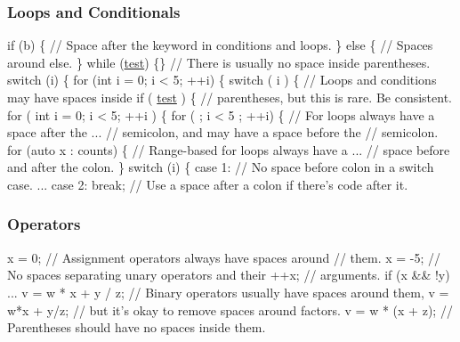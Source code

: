 \subsubsection*{Loops and Conditionals}


\begin{DoxyCode}
\textcolor{keywordflow}{if} (b) \{          \textcolor{comment}{// Space after the keyword in conditions and loops.}
\} \textcolor{keywordflow}{else} \{          \textcolor{comment}{// Spaces around else.}
\}
\textcolor{keywordflow}{while} (\hyperlink{namespacetest}{test}) \{\}   \textcolor{comment}{// There is usually no space inside parentheses.}
\textcolor{keywordflow}{switch} (i) \{
\textcolor{keywordflow}{for} (\textcolor{keywordtype}{int} i = 0; i < 5; ++i) \{
\textcolor{keywordflow}{switch} ( i ) \{    \textcolor{comment}{// Loops and conditions may have spaces inside}
\textcolor{keywordflow}{if} ( \hyperlink{namespacetest}{test} ) \{     \textcolor{comment}{// parentheses, but this is rare.  Be consistent.}
\textcolor{keywordflow}{for} ( \textcolor{keywordtype}{int} i = 0; i < 5; ++i ) \{
\textcolor{keywordflow}{for} ( ; i < 5 ; ++i) \{  \textcolor{comment}{// For loops always have a space after the}
    ...                 \textcolor{comment}{// semicolon, and may have a space before the}
                        \textcolor{comment}{// semicolon.}
\textcolor{keywordflow}{for} (\textcolor{keyword}{auto} x : counts) \{  \textcolor{comment}{// Range-based for loops always have a}
    ...                  \textcolor{comment}{// space before and after the colon.}
\}
\textcolor{keywordflow}{switch} (i) \{
    \textcolor{keywordflow}{case} 1:         \textcolor{comment}{// No space before colon in a switch case.}
    ...
    \textcolor{keywordflow}{case} 2: \textcolor{keywordflow}{break};  \textcolor{comment}{// Use a space after a colon if there's code after it.}
\end{DoxyCode}


\subsubsection*{Operators}


\begin{DoxyCode}
x = 0;              \textcolor{comment}{// Assignment operators always have spaces around}
                    \textcolor{comment}{// them.}
x = -5;             \textcolor{comment}{// No spaces separating unary operators and their}
++x;                \textcolor{comment}{// arguments.}
\textcolor{keywordflow}{if} (x && !y)
    ...
v = w * x + y / z;  \textcolor{comment}{// Binary operators usually have spaces around them,}
v = w*x + y/z;      \textcolor{comment}{// but it's okay to remove spaces around factors.}
v = w * (x + z);    \textcolor{comment}{// Parentheses should have no spaces inside them.}
\end{DoxyCode}


